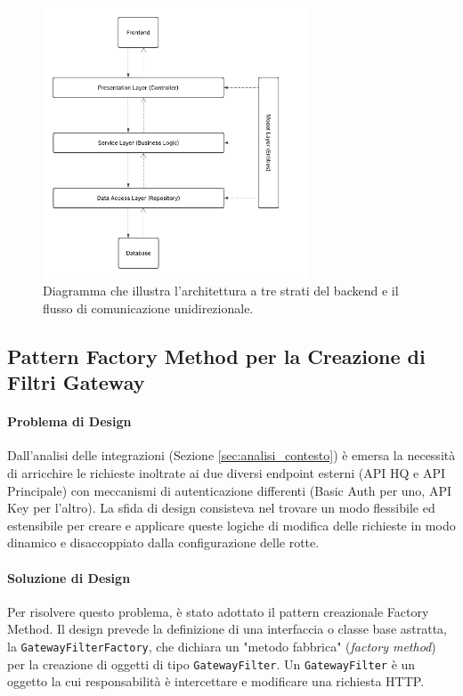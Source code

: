 \documentclass[12pt,a4paper,openright,twoside]{book}
\begin{document}
\begin{figure}[H]
    \centering
    \includegraphics[width=0.7\textwidth]{figures/layer_design.pdf} %
    \caption{Diagramma che illustra l'architettura a tre strati del backend e il flusso di comunicazione unidirezionale.}
    \label{fig:layered_architecture_uml}
\end{figure}

\subsection{Pattern Factory Method per la Creazione di Filtri Gateway}
\label{subsec:design_factory}

\paragraph{Problema di Design}
Dall'analisi delle integrazioni (Sezione \ref{sec:analisi_contesto}) è emersa la necessità di arricchire le richieste inoltrate ai due diversi endpoint esterni (API HQ e API Principale) con meccanismi di autenticazione differenti (Basic Auth per uno, API Key per l'altro). La sfida di design consisteva nel trovare un modo flessibile ed estensibile per creare e applicare queste logiche di modifica delle richieste in modo dinamico e disaccoppiato dalla configurazione delle rotte.


\paragraph{Soluzione di Design}
Per risolvere questo problema, è stato adottato il pattern creazionale Factory Method. Il design prevede la definizione di una interfaccia o classe base astratta, la \texttt{GatewayFilterFactory}, che dichiara un "metodo fabbrica" (\textit{factory method}) per la creazione di oggetti di tipo \texttt{GatewayFilter}. Un \texttt{GatewayFilter} è un oggetto la cui responsabilità è intercettare e modificare una richiesta HTTP.
\end{document}
